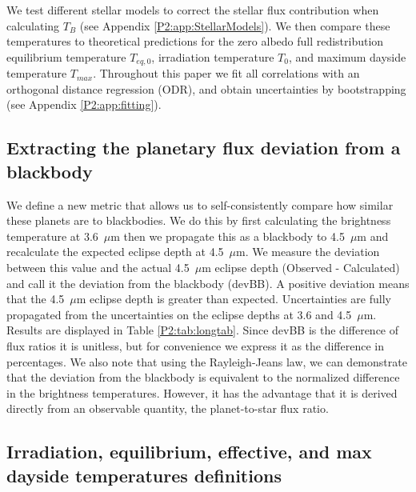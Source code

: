 
We test different stellar models to correct the stellar flux contribution when calculating $T_B$ (see Appendix \ref{P2:app:StellarModels}). We then compare these temperatures to theoretical predictions for the zero albedo full redistribution equilibrium temperature $T_{eq,\textit{0}}$, irradiation temperature $T_0$, and maximum dayside temperature $T_{max}$. Throughout this paper we fit all correlations with an orthogonal distance regression (ODR), and obtain uncertainties by bootstrapping (see Appendix \ref{P2:app:fitting}).

\subsection{Extracting the planetary flux deviation from a blackbody}

We define a new metric that allows us to self-consistently compare how similar these planets are to blackbodies. We do this by first calculating the brightness temperature at 3.6~$\mu$m then we propagate this as a blackbody to 4.5~$\mu$m and recalculate the expected eclipse depth at 4.5~$\mu$m. We measure the deviation between this value and the actual 4.5~$\mu$m eclipse depth (Observed - Calculated) and call it the deviation from the blackbody (devBB). A positive deviation means that the 4.5~$\mu$m eclipse depth is greater than expected. Uncertainties are fully propagated from the uncertainties on the eclipse depths at 3.6 and 4.5~$\mu$m. Results are displayed in Table \ref{P2:tab:longtab}. Since devBB is the difference of flux ratios it is unitless, but for convenience we express it as the difference in percentages. We also note that using the Rayleigh-Jeans law, we can demonstrate that the deviation from the blackbody is equivalent to the normalized difference in the brightness temperatures. However, it has the advantage that it is derived directly from an observable quantity, the planet-to-star flux ratio.

\subsection{Irradiation, equilibrium, effective, and max dayside temperatures definitions}
\label{P2:app:Temps}

